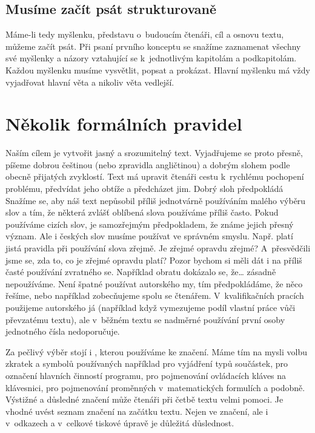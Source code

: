 \documentclass{template/socthesis}
\begin{document}
\subsection{Musíme začít psát strukturovaně}
Máme-li tedy myšlenku, představu o~budoucím čtenáři, cíl a osnovu textu, můžeme začít psát. Při psaní prvního konceptu se snažíme zaznamenat všechny své myšlenky a názory vztahující se k~jednotlivým kapitolám a podkapitolám. Každou myšlenku musíme vysvětlit, popsat a prokázat. Hlavní myšlenku má vždy vyjadřovat hlavní věta a nikoliv věta vedlejší.


\section{Několik formálních pravidel}
Naším cílem je vytvořit jasný a srozumitelný text. Vyjadřujeme se proto přesně, píšeme dobrou češtinou (nebo zpravidla angličtinou) a dobrým slohem podle obecně přijatých zvyklostí. Text má upravit čtenáři cestu k~rychlému pochopení problému, předvídat jeho obtíže a předcházet jim. Dobrý sloh předpokládá  Snažíme se, aby náš text nepůsobil příliš jednotvárně používáním malého výběru slov a tím, že některá zvlášť oblíbená slova používáme příliš často. Pokud používáme cizích slov, je samozřejmým předpokladem, že známe jejich přesný význam. Ale i českých slov musíme používat ve správném smyslu. Např. platí jistá pravidla při používání slova zřejmě. Je zřejmé opravdu zřejmé? A~přesvědčili jsme se, zda to, co je zřejmé opravdu platí? Pozor bychom si měli dát i na příliš časté používání zvratného se. Například obratu dokázalo se, že… zásadně nepoužíváme. Není špatné používat autorského my, tím předpokládáme, že něco řešíme, nebo například zobecňujeme spolu se čtenářem. V~kvalifikačních pracích použijeme autorského já (například když vymezujeme podíl vlastní práce vůči převzatému textu), ale v~běžném textu se nadměrné používání první osoby jednotného čísla nedoporučuje.

Za pečlivý výběr stojí i , kterou používáme ke značení. Máme tím na mysli volbu zkratek a symbolů používaných například pro vyjádření typů součástek, pro označení hlavních činností programu, pro pojmenování ovládacích kláves na klávesnici, pro pojmenování proměnných v~matematických formulích a podobně. Výstižné a důsledné značení může čtenáři při četbě textu velmi pomoci. Je vhodné uvést seznam značení na začátku textu. Nejen ve značení, ale i v~odkazech a v~celkové tiskové úpravě je důležitá důslednost.
\end{document}
